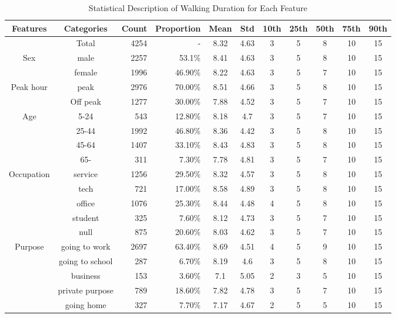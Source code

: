 \documentclass[sustainability,article,submit,moreauthors,pdftex,10pt,a4paper]{Definitions/mdpi}
\begin{document}
\begin{table}[h]
	\caption{Statistical Description of Walking Duration for Each Feature}
	\label{table:StatisticalDescription}
	\centering
	\small
	\renewcommand{\arraystretch}{1.25}
	\begin{tabular}{ccrrccccccc}
		\toprule
		Features & Categories & Count & Proportion & Mean & Std & 10th & 25th & 50th & 75th & 90th\\
		\midrule
		& Total    & 4254  & - & 8.32  & 4.63  & 3     & 5     & 8     & 10    & 15 \\
		\midrule
		\multicolumn{1}{c}{Sex}
		& male     & 2257  & 53.1\%    & 8.41  & 4.63  & 3     & 5     & 8     & 10    & 15 \\
		& female   & 1996  & 46.90\%   & 8.22  & 4.63  & 3     & 5     & 7     & 10    & 15 \\
		\midrule
		\multicolumn{1}{c}{Peak hour}
		& peak     & 2976  & 70.00\%   & 8.51  & 4.66  & 3     & 5     & 8     & 10    & 15 \\
		& Off peak & 1277  & 30.00\%   & 7.88  & 4.52  & 3     & 5     & 7     & 10    & 15 \\
		\midrule
		\multicolumn{1}{c}{Age}
		& 5-24     & 543   & 12.80\%   & 8.18  & 4.7   & 3     & 5     & 7     & 10    & 15 \\
		& 25-44    & 1992  & 46.80\%   & 8.36  & 4.42  & 3     & 5     & 8     & 10    & 15 \\
		& 45-64    & 1407  & 33.10\%   & 8.43  & 4.83  & 3     & 5     & 8     & 10    & 15 \\
		& 65-      & 311   &  7.30\%   & 7.78  & 4.81  & 3     & 5     & 7     & 10    & 15 \\
		\midrule
		\multicolumn{1}{c}{Occupation}
		& service  & 1256  & 29.50\%   & 8.32  & 4.57  & 3     & 5     & 8     & 10    & 15 \\
		& tech     & 721   & 17.00\%   & 8.58  & 4.89  & 3     & 5     & 8     & 10    & 15 \\
		& office   & 1076  & 25.30\%   & 8.44  & 4.48  & 4     & 5     & 8     & 10    & 15 \\
		& student  & 325   &  7.60\%   & 8.12  & 4.73  & 3     & 5     & 7     & 10    & 15 \\
		& null     & 875   & 20.60\%   & 8.03  & 4.62  & 3     & 5     & 7     & 10    & 15 \\
		\midrule
		\multicolumn{1}{c}{Purpose}
		& going to work   & 2697  & 63.40\% & 8.69  & 4.51  & 4     & 5     & 9     & 10    & 15 \\
		& going to school & 287   &  6.70\% & 8.19  & 4.6   & 3     & 5     & 8     & 10    & 15 \\
		& business   & 153   &  3.60\% & 7.1   & 5.05  & 2     & 3     & 5     & 10    & 15 \\
		& private purpose     & 789   & 18.60\% & 7.82  & 4.78  & 3     & 5     & 7     & 10    & 15 \\
		& going home          & 327   &  7.70\% & 7.17  & 4.67  & 2     & 5     & 5     & 10    & 15 \\
		\bottomrule
	\end{tabular}
	\normalsize
\end{table}
\end{document}
